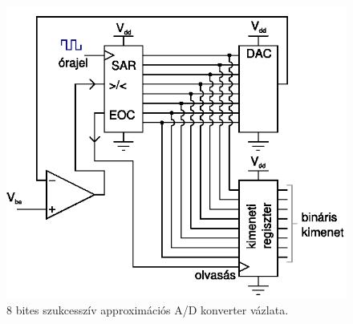 \documentclass[12pt]{article}
\theoremstyle{plain}
\begin{document}
\begin{figure}[]
	\centering
	\includegraphics[width=0.7\linewidth]{media/ADC_SAR}
	\caption{8 bites szukcesszív approximációs A/D konverter vázlata.}
	\label{fig:adcsar}
\end{figure}
\end{document}
